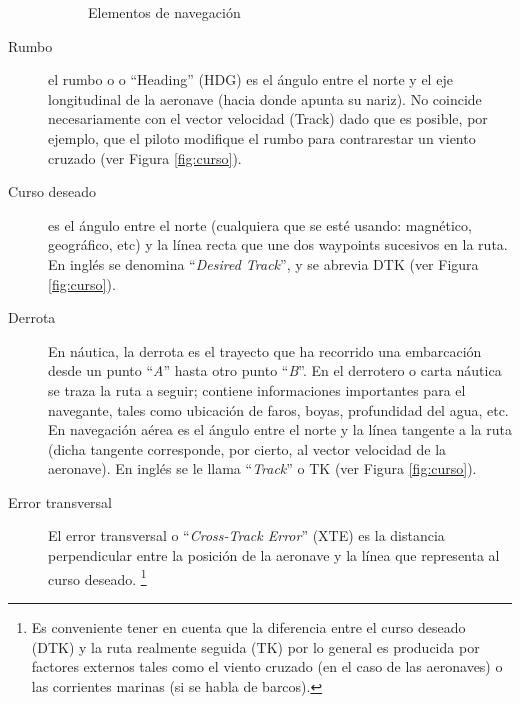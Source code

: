 \begin{description}
\begin{figure}[!h]
  \caption{Elementos de navegaci\'on}
\end{figure}


  \item[Rumbo] el rumbo o o ``Heading'' (HDG) es el \'angulo entre el norte y el eje   longitudinal de la aeronave (hacia donde apunta su nariz). No
  coincide necesariamente con el vector velocidad (Track) dado que es
  posible, por ejemplo, que el piloto modifique el rumbo para
  contrarestar un viento cruzado (ver Figura \ref{fig:curso}).

\item [Curso deseado] es el \'angulo entre el norte (cualquiera que se est\'e usando: magn\'etico, geogr\'afico, etc) y la l\'inea recta que une dos waypoints sucesivos en la ruta. En ingl\'es se denomina ``\textit{Desired Track}'', y se abrevia DTK (ver Figura \ref{fig:curso}).

\item [Derrota] En n\'autica, la derrota es el trayecto que ha recorrido una embarcaci\'on desde un punto ``\textit{A}'' hasta otro punto ``\textit{B}''. En el derrotero o carta n\'autica se traza la ruta a seguir; contiene informaciones importantes para el navegante, tales como ubicaci\'on de faros, boyas, profundidad del agua, etc. En navegaci\'on a\'erea es el \'angulo entre el norte y la l\'inea tangente a la ruta (dicha tangente corresponde, por cierto, al vector velocidad de la aeronave). En ingl\'es se le llama ``\textit{Track}'' o TK (ver Figura \ref{fig:curso}).

\item [Error transversal] El error transversal o ``\textit{Cross-Track Error}'' (XTE) es la distancia perpendicular entre la posici\'on de la aeronave y la l\'inea que representa al curso deseado. \footnote{Es conveniente tener en cuenta que la diferencia entre el curso deseado (DTK) y la ruta realmente seguida (TK) por lo general es producida por factores externos tales como el viento cruzado (en el caso de las aeronaves) o las corrientes marinas (si se habla de barcos).}

\end{description}

